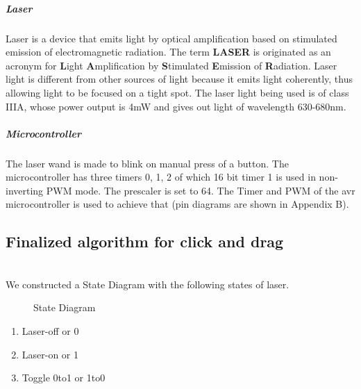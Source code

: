 \documentclass[12pt, a4paper]{article}
\begin{document}
\subparagraph{Laser}

Laser is a device that emits light by optical amplification based on stimulated emission of electromagnetic radiation. The term \textbf{LASER} is originated as an acronym for \textbf{L}ight \textbf{A}mplification by \textbf{S}timulated \textbf{E}mission of \textbf{R}adiation. Laser light is different from other sources of light because it emits light coherently, thus allowing light to be focused on a tight spot. The laser light being used is of class IIIA, whose power output is 4mW and gives out light of wavelength 630-680nm. 

\subparagraph{Microcontroller}

The laser wand is made to blink on manual press of a button. The microcontroller has three timers 0, 1, 2 of which 16 bit timer 1 is used in non-inverting PWM mode. The prescaler is set to 64. The Timer and PWM of the avr microcontroller is used to achieve that (pin diagrams are shown in Appendix B).

\subsection{Finalized algorithm for click and drag}
~\\
	We constructed a State Diagram with the following states of laser.
	\begin{figure}
\centering
{}
\caption{State Diagram}
\end{figure}
\begin{enumerate}
\item Laser-off or 0
\item Laser-on or 1
\item Toggle 0to1 or 1to0 
\end{enumerate}
\end{document}
